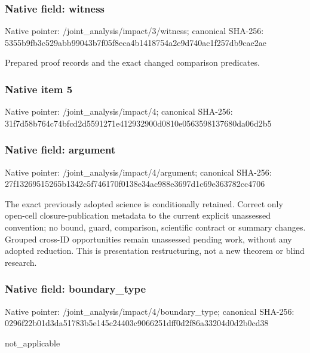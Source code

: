 \documentclass[10pt,a4paper]{article}
\begin{document}
\subsubsection{Native field: witness}
Native pointer: /joint\_\allowbreak{}analysis/impact/3/witness; canonical SHA-256: 5355b9fb3c529abb99043b7f05f8eca4b1418754a2e9d740ac1f257db9cae2ae

\begingroup\raggedright\sloppy Prepared proof records and the exact changed comparison predicates.\par\endgroup

\subsubsection{Native item 5}
Native pointer: /joint\_\allowbreak{}analysis/impact/4; canonical SHA-256: 31f7d58b764c74bfcd2d5591271e412932900d0810e0563598137680da06d2b5

\subsubsection{Native field: argument}
Native pointer: /joint\_\allowbreak{}analysis/impact/4/argument; canonical SHA-256: 27f13269515265b1342c5f746170f0138e34ac988e3697d1c69e363782cc4706

\begingroup\raggedright\sloppy The exact previously adopted science is conditionally retained. Correct only open-cell closure-publication metadata to the current explicit unassessed convention;\allowbreak{} no bound,\allowbreak{} guard,\allowbreak{} comparison,\allowbreak{} scientific contract or summary changes. Grouped cross-ID opportunities remain unassessed pending work,\allowbreak{} without any adopted reduction. This is presentation restructuring,\allowbreak{} not a new theorem or blind research.\par\endgroup

\subsubsection{Native field: boundary\_\allowbreak{}type}
Native pointer: /joint\_\allowbreak{}analysis/impact/4/boundary\_\allowbreak{}type; canonical SHA-256: 0296f22b01d3da51783b5e145c24403c9066251dff0d2f86a33204d0d2b0cd38

\begingroup\raggedright\sloppy not\_\allowbreak{}applicable\par\endgroup
\end{document}
